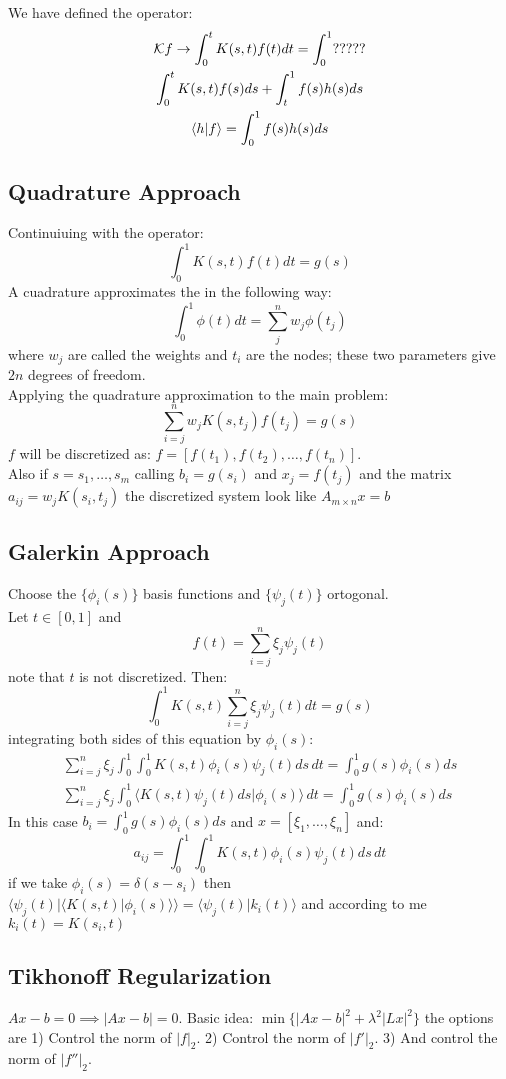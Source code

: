 We have defined the operator:
\begin{gather*}
\mathbf{\mathcal{K}} f\to \int_0^t K(s,t)f(t) dt = \int_0^1 ?????\\
\int_0^t K(s,t) f(s)ds + \int_t^1 f(s)h(s)ds \\
\langle h | f \rangle = \int_0^1 f(s)h(s)ds
\end{gather*}

\subsection{Quadrature Approach}
Continuiuing with the operator:
$$\int_0^1 K(s,t)f(t) dt = g(s)$$
A cuadrature approximates the in the following way:
$$\int_0^1 \phi(t)dt = \sum_j^n w_j \phi(t_j)$$
where $w_j$ are called the weights and $t_i$ are the nodes; these two parameters give $2n$ degrees of freedom.\\
Applying the quadrature approximation to the main problem:
$$ \sum_{i=j}^n w_j K(s,t_j)f(t_j) = g(s)$$
$f$ will be discretized as: $f=[f(t_1),f(t_2),\ldots,f(t_n)]$.\\
Also if $s=s_1,\ldots,s_m$ calling $b_i=g(s_i)$ and $x_j=f(t_j)$ and the matrix $a_{ij}= w_j K(s_i,t_j)$ the discretized system look like $A_{m\times n}x=b$
\subsection{Galerkin Approach}
Choose the $\{\phi_i(s)\}$ basis functions and $\{\psi_j(t)\}$ ortogonal.\\
Let $t\in [0,1]$ and $$f(t) = \sum_{i=j}^n \xi_j\psi_j(t)$$ note that $t$ is not discretized. Then:
$$\int_0^1 K(s,t)\sum_{i=j}^n \xi_j\psi_j(t)dt=g(s)$$
integrating both sides of this equation by $\phi_i(s)$:
\begin{gather*}
\sum_{i=j}^n \xi_j \int_0^1\int_0^1 K(s,t) \phi_i(s) \psi_j(t)ds\, dt= \int_0^1 g(s)\phi_i(s)ds\\
\sum_{i=j}^n \xi_j \int_0^1\langle  K(s,t)\psi_j(t)ds| \phi_i(s) \rangle \, dt= \int_0^1 g(s)\phi_i(s)ds
\end{gather*}
In this case $b_i=\int_0^1 g(s)\phi_i(s)ds$ and $x=[\xi_1,\ldots,\xi_n]$ and:
$$a_{ij} = \int_0^1\int_0^1 K(s,t) \phi_i(s) \psi_j(t)ds\, dt$$
if we take $\phi_i(s)=\delta(s-s_i)$ then $\langle \psi_j(t) | \langle K(s,t)|\phi_i(s)\rangle \rangle = \langle\psi_j(t) | k_i(t)\rangle$ and according to me $k_i(t)=K(s_i,t)$

\subsection{Tikhonoff Regularization}
$Ax-b=0\implies |Ax-b|=0$. Basic idea: $\min\{|Ax-b|^2 + \lambda^2 |Lx|^2 \}$ the options are 1) Control the norm of $|f|_2$. 2) Control the norm of $|f'|_2$. 3) And control the norm of $|f''|_2$.\\



